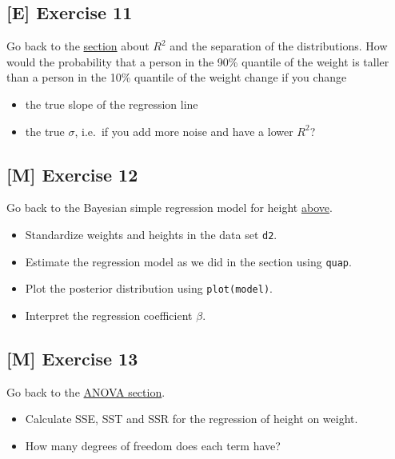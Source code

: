 \documentclass[
]{book}
\providecommand{\tightlist}{%
  \setlength{\itemsep}{0pt}\setlength{\parskip}{0pt}}
\begin{document}
\subsection{{[}E{]} Exercise 11}\label{exercise11_simpl_lin_reg}

Go back to the \hyperref[seperating_property]{section} about \(R^2\) and the separation of the distributions.
How would the probability that a person in the 90\% quantile of the weight
is taller than a person in the 10\% quantile of the weight change if you change

\begin{itemize}
\tightlist
\item
  the true slope of the regression line
\item
  the true \(\sigma\), i.e.~if you add more noise and have a lower \(R^2\)?
\end{itemize}

\subsection{{[}M{]} Exercise 12}\label{exercise12_simpl_lin_reg}

Go back to the Bayesian simple regression model for height \hyperref[simple_lin_reg_bayes]{above}.

\begin{itemize}
\tightlist
\item
  Standardize weights and heights in the data set \texttt{d2}.
\item
  Estimate the regression model as we did in the section using \texttt{quap}.
\item
  Plot the posterior distribution using \texttt{plot(model)}.
\item
  Interpret the regression coefficient \(\beta\).
\end{itemize}

\subsection{{[}M{]} Exercise 13}\label{exercise13_simpl_lin_reg}

Go back to the \hyperref[analysis_of_variance]{ANOVA section}.

\begin{itemize}
\tightlist
\item
  Calculate SSE, SST and SSR for the regression of height on weight.
\item
  How many degrees of freedom does each term have?
\end{itemize}
\end{document}
